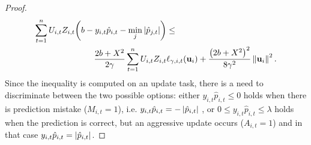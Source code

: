 \begin{proof}
\begin{equation}
\begin{split}
\sum_{t=1}^{n}U_{i,t}Z_{i,t}{\left({b -y_{i,t}\hat{p}_{i,t}-\min_j{\left\vert{\hat{p}_{j,t}}\right\vert}}\right)}&\le\\
\frac{2b+X^2}{2\gamma}\sum_{t=1}^{n}U_{i,t}Z_{i,t}&\ell_{\gamma,i,t}(\mathbf{u}_i)+\frac{\left({2b+X^2}\right)^2}{8{\gamma}^2}\left\Vert {\mathbf{u}_i} \right\Vert^2.
\label{eq:step_3_in_proof_agressive}
\end{split}
\end{equation}
 Since the inequality is computed on an update task, there is a need to discriminate between   the two possible options: either 
$y_{i,t}\hat{p}_{i,t}\le0$ holds  when there is prediction mistake ($M_{i,t}=1$), i.e. $y_{i,t}\hat{p}_{i,t}=-\left\vert{\hat{p}_{i,t}}\right\vert$  ,  or $0\le y_{i,t}\hat{p}_{i,t}\le\lambda$ holds  when the prediction is correct,  but an aggressive update occurs ($A_{i,t}=1$) and  in that case  $y_{i,t}\hat{p}_{i,t}=\left\vert{\hat{p}_{i,t}}\right\vert$.


\end{proof}
